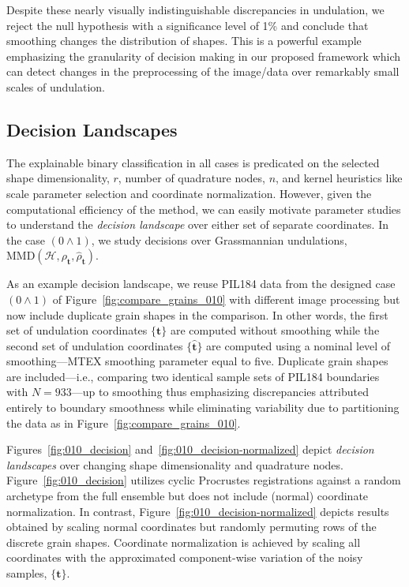 \documentclass[pdflatex,iicol]{sn-jnl}%
\theoremstyle{thmstyleone}%
\theoremstyle{thmstyletwo}%
\theoremstyle{thmstylethree}%
\begin{document}
Despite these nearly visually indistinguishable discrepancies in undulation, we reject the null hypothesis with a significance level of 1\% and conclude that smoothing changes the distribution of shapes. This is a powerful example emphasizing the granularity of decision making in our proposed framework which can detect changes in the preprocessing of the image/data over remarkably small scales of undulation.

\subsection{Decision Landscapes}

The explainable binary classification in all cases is predicated on the selected shape dimensionality, $r$, number of quadrature nodes, $n$, and kernel heuristics like scale parameter selection and coordinate normalization. However, given the computational efficiency of the method, we can easily motivate parameter studies to understand the \textit{decision landscape} over either set of separate coordinates. In the case $(0 \wedge 1)$, we study decisions over Grassmannian undulations, $\text{MMD}(\mathcal{H},\rho_{\boldsymbol{t}},\widehat{\rho}_{\boldsymbol{t}}) $.

As an example decision landscape, we reuse PIL184 data from the designed case $(0 \wedge 1)$ of Figure~\ref{fig:compare_grains_010} with different image processing but now include duplicate grain shapes in the comparison. In other words, the first set of undulation coordinates $\lbrace \boldsymbol{t} \rbrace$ are computed without smoothing while the second set of undulation coordinates $\lbrace \widehat{\boldsymbol{t}} \rbrace$ are computed using a nominal level of smoothing---MTEX smoothing parameter equal to five. Duplicate grain shapes are included---i.e., comparing two identical sample sets of PIL184 boundaries with $N= 933$---up to smoothing thus emphasizing discrepancies attributed entirely to boundary smoothness while eliminating variability due to partitioning the data as in Figure~\ref{fig:compare_grains_010}. 

Figures~\ref{fig:010_decision} and~\ref{fig:010_decision-normalized} depict \textit{decision landscapes} over changing shape dimensionality and quadrature nodes. Figure~\ref{fig:010_decision} utilizes cyclic Procrustes registrations against a random archetype from the full ensemble but does not include (normal) coordinate normalization. In contrast, Figure~\ref{fig:010_decision-normalized} depicts results obtained by scaling normal coordinates but randomly permuting rows of the discrete grain shapes. Coordinate normalization is achieved by scaling all coordinates with the approximated component-wise variation of the noisy samples, $\lbrace \boldsymbol{t}\rbrace$. 
\end{document}
